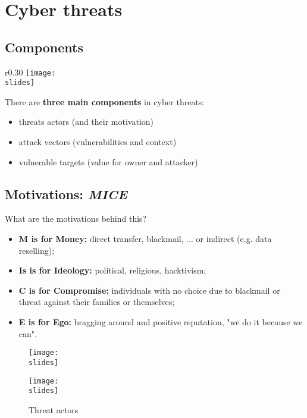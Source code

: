 \section{Cyber threats}

\subsection{Components}
\begin{wrapfigure}{r}{0.30\textwidth}
  \centering
  \texttt{[image: \\slides]}
\end{wrapfigure}
There are \textbf{three main components} in cyber threats:
\begin{itemize}
  \item threats actors (and their motivation)
  \item attack vectors (vulnerabilities and context)
  \item vulnerable targets (value for owner and attacker)
\end{itemize}


\subsection{Motivations: \emph{MICE}}
What are the motivations behind this?
\begin{itemize}
  \item \textbf{M is for Money:} direct transfer, blackmail, ... or indirect (e.g. data reselling);
  \item \textbf{Is is for Ideology:} political, religious, hacktivism;
  \item \textbf{C is for Compromise:} individuals with no choice due to blackmail or threat against their families or themselves;
  \item \textbf{E is for Ego:} bragging around and positive reputation, "we do it because we can".
\end{itemize}
\begin{figure}[h]
  \texttt{[image: \\slides]}
\end{figure}
\begin{figure}[h]
  \centering
  \texttt{[image: \\slides]}
  \caption{Threat actors}
\end{figure}

